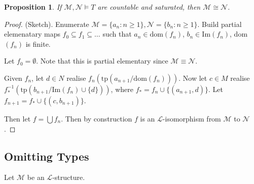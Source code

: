 \documentclass[]{article}
\theoremstyle{custhm}
\theoremstyle{cusdef}
\theoremstyle{custhm}
\theoremstyle{custhm}
\theoremstyle{custhm}
\newtheorem{prop}[theorem]{Proposition}
\theoremstyle{ex}
\theoremstyle{custhm}
\theoremstyle{cusdef}
\theoremstyle{remark}
\theoremstyle{remark}
\theoremstyle{numremark}
\renewcommand{\L}{\mathcal{L}}
\newcommand{\M}{\mathcal{M}}
\newcommand{\tp}{\textrm{tp}}
\newcommand{\N}{\mathcal{N}}
\renewcommand{\subset}{\subseteq}
\begin{document}
\begin{prop}
If $\M,\N\models T$ are countable and saturated, then $\M\cong\N$.
\end{prop}
\begin{proof}
(Sketch). Enumerate $\M = \{a_n:n\ge 1\},\N = \{b_n:n\ge 1\}$. Build partial elemenatary maps $f_0\subset f_1\subset \dots$ such that $a_n \in \textrm{dom}(f_n)$, $b_n\in \textrm{Im}(f_n)$, dom$(f_n)$ is finite.

Let $f_0 = \emptyset$. Note that this is partial elementary since $\M\equiv \N$.

Given $f_n$, let $d\in N$ realise $f_n\left(\tp\left(a_{n+1}/\textrm{dom}(f_n)\right)\right)$. Now let $c\in M$ realise $f_\ast^{-1}(\tp(b_{n+1}/\textrm{Im}(f_n)\cup\{d\}))$, where $f_\ast = f_n\cup\{(a_{n+1},d)\}$. Let $f_{n+1} = f_\ast \cup \{(c,b_{n+1})\}$.

Then let $f = \bigcup f_n$. Then by construction $f$ is an $\L$-isomorphism from $\M$ to $\N$.
\end{proof}

\subsection*{Omitting Types}

Let $\M$ be an $\L$-structure.
\end{document}

